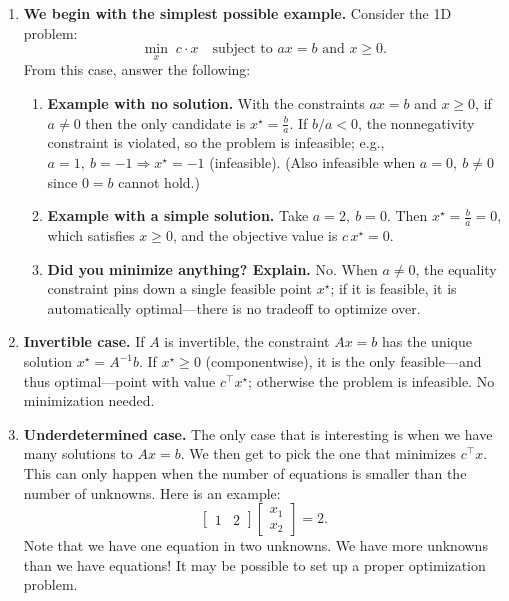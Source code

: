 \documentclass[11pt]{article}
\begin{document}
	\begin{enumerate}[label=\textbf{1(\alph*)}]
		\item \textbf{We begin with the simplest possible example.} Consider the 1D problem:
		\begin{equation}
			\min_{x}\; c \cdot x
			\quad \text{subject to } a x = b \text{ and } x \ge 0.
			\label{eq:1d}
		\end{equation}
		From this case, answer the following:
		\begin{enumerate}[label=\roman*)]
			\item \textbf{Example with no solution.}
			With the constraints \(ax=b\) and \(x\ge 0\), if \(a\neq 0\) then the only candidate is
			\(x^\star=\tfrac{b}{a}\).
			If \(b/a<0\), the nonnegativity constraint is violated, so the problem is infeasible; e.g.,
			\(a=1,\ b=-1 \Rightarrow x^\star=-1\) (infeasible).
			(Also infeasible when \(a=0,\ b\neq 0\) since \(0=b\) cannot hold.)
			
			\item \textbf{Example with a simple solution.}
			Take \(a=2,\ b=0\). Then \(x^\star=\tfrac{b}{a}=0\), which satisfies \(x\ge 0\), and the objective value is \(c\,x^\star=0\).
			
			\item \textbf{Did you minimize anything? Explain.}
			No. When \(a\neq 0\), the equality constraint pins down a single feasible point \(x^\star\);
			if it is feasible, it is automatically optimal—there is no tradeoff to optimize over.
		\end{enumerate}

		\item \textbf{Invertible case.} If $A$ is invertible, the constraint $Ax=b$ has the unique solution $x^\star=A^{-1}b$. If $x^\star\ge 0$ (componentwise), it is the only feasible—and thus optimal—point with value $c^\top x^\star$; otherwise the problem is infeasible. No minimization needed.

		\item \textbf{Underdetermined case.} The only case that is interesting is when we have many solutions to $Ax = b$.
		We then get to pick the one that minimizes $c^{\top}x$. This can only happen when
		the number of equations is smaller than the number of unknowns. Here is an example:
		\[
		\begin{bmatrix} 1 & 2 \end{bmatrix}
		\begin{bmatrix} x_1 \\ x_2 \end{bmatrix} = 2.
		\]
		Note that we have one equation in two unknowns. We have more unknowns
		than we have equations! It may be possible to set up a proper optimization
		problem.
		

\end{enumerate}
\end{document}
